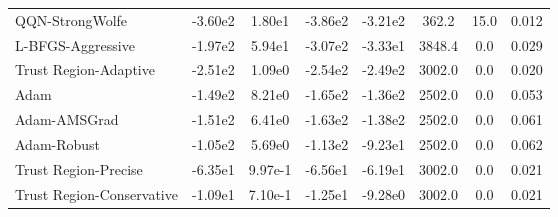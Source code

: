 \documentclass{article}
\begin{document}
\begin{table}[htbp]
{\begin{tabular}{p{2.5cm}*{7}{c}}
QQN-StrongWolfe & -3.60e2 & 1.80e1 & -3.86e2 & -3.21e2 & 362.2 & 15.0 & 0.012 \\
L-BFGS-Aggressive & -1.97e2 & 5.94e1 & -3.07e2 & -3.33e1 & 3848.4 & 0.0 & 0.029 \\
Trust Region-Adaptive & -2.51e2 & 1.09e0 & -2.54e2 & -2.49e2 & 3002.0 & 0.0 & 0.020 \\
Adam & -1.49e2 & 8.21e0 & -1.65e2 & -1.36e2 & 2502.0 & 0.0 & 0.053 \\
Adam-AMSGrad & -1.51e2 & 6.41e0 & -1.63e2 & -1.38e2 & 2502.0 & 0.0 & 0.061 \\
Adam-Robust & -1.05e2 & 5.69e0 & -1.13e2 & -9.23e1 & 2502.0 & 0.0 & 0.062 \\
Trust Region-Precise & -6.35e1 & 9.97e-1 & -6.56e1 & -6.19e1 & 3002.0 & 0.0 & 0.021 \\
Trust Region-Conservative & -1.09e1 & 7.10e-1 & -1.25e1 & -9.28e0 & 3002.0 & 0.0 & 0.021 \\
\bottomrule
\end{tabular}
}
\end{table}
\end{document}
